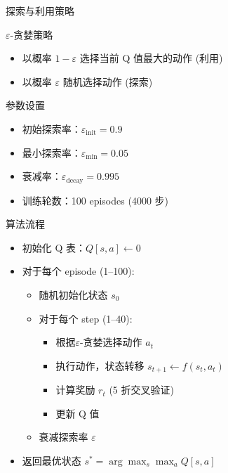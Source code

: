 \begin{frame}{探索与利用策略}
    \begin{block}{$\varepsilon$-贪婪策略}
        \begin{itemize}
            \item 以概率 $1-\varepsilon$ 选择当前 Q 值最大的动作 (利用)
            \item 以概率 $\varepsilon$ 随机选择动作 (探索)
        \end{itemize}
    \end{block}
    
    \vspace{0.3cm}
    \begin{exampleblock}{参数设置}
        \begin{itemize}
            \item 初始探索率：$\varepsilon_{\text{init}} = 0.9$
            \item 最小探索率：$\varepsilon_{\text{min}} = 0.05$
            \item 衰减率：$\varepsilon_{\text{decay}} = 0.995$
            \item 训练轮数：100 episodes (4000 步)
        \end{itemize}
    \end{exampleblock}
\end{frame}

\begin{frame}{算法流程}
    \begin{itemize}
        \item 初始化 Q 表：$Q[s, a] \leftarrow 0$
        \item 对于每个 episode (1--100):
        \begin{itemize}
            \item 随机初始化状态 $s_0$
            \item 对于每个 step (1--40):
            \begin{itemize}
                \item 根据$\varepsilon$-贪婪选择动作 $a_t$
                \item 执行动作，状态转移 $s_{t+1} \leftarrow f(s_t, a_t)$
                \item 计算奖励 $r_t$ (5 折交叉验证)
                \item 更新 Q 值
            \end{itemize}
            \item 衰减探索率 $\varepsilon$
        \end{itemize}
        \item 返回最优状态 $s^* = \arg\max_s \max_a Q[s, a]$
    \end{itemize}
\end{frame}

